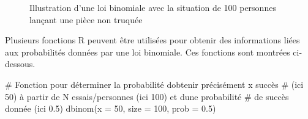 \documentclass[
  letterpaper,
]{book}
\newenvironment{Shaded}{\begin{snugshade}}{\end{snugshade}}
\newcommand{\AttributeTok}[1]{\textcolor[rgb]{0.40,0.45,0.13}{#1}}
\newcommand{\CommentTok}[1]{\textcolor[rgb]{0.37,0.37,0.37}{#1}}
\newcommand{\DecValTok}[1]{\textcolor[rgb]{0.68,0.00,0.00}{#1}}
\newcommand{\FloatTok}[1]{\textcolor[rgb]{0.68,0.00,0.00}{#1}}
\newcommand{\FunctionTok}[1]{\textcolor[rgb]{0.28,0.35,0.67}{#1}}
\newcommand{\NormalTok}[1]{\textcolor[rgb]{0.00,0.23,0.31}{#1}}
\begin{document}
\begin{figure}


\caption{\label{fig-distriBinom}Illustration d'une loi binomiale avec la
situation de 100 personnes lançant une pièce non truquée}

\end{figure}%

Plusieurs fonctions R peuvent être utilisées pour obtenir des
informations liées aux probabilités données par une loi binomiale. Ces
fonctions sont montrées ci-dessous.

\begin{Shaded}
\begin{Highlighting}[]
\CommentTok{\# Fonction pour déterminer la probabilité d\textquotesingle{}obtenir précisément x succès }
\CommentTok{\# (ici 50) à partir de N essais/personnes (ici 100) et d\textquotesingle{}une probabilité }
\CommentTok{\# de succès donnée (ici 0.5)}
\FunctionTok{dbinom}\NormalTok{(}\AttributeTok{x =} \DecValTok{50}\NormalTok{, }\AttributeTok{size =} \DecValTok{100}\NormalTok{, }\AttributeTok{prob =} \FloatTok{0.5}\NormalTok{)}
\end{Highlighting}
\end{Shaded}
\end{document}
